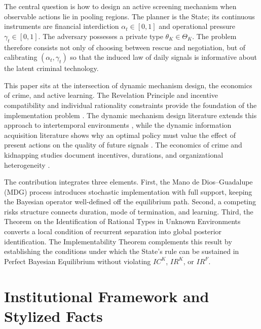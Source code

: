 \documentclass[12pt,a4paper]{article}
\providecommand{\parencite}{\citep}
\theoremstyle{plain}
\theoremstyle{definition}
\theoremstyle{remark}
\newcommand{\1}{\mathbf{1}}
\begin{document}
The central question is how to design an active screening mechanism when observable
actions lie in pooling regions. The planner is the State; its continuous instruments are
financial interdiction $\alpha_t\in[0,1]$ and operational pressure $\gamma_t\in[0,1]$.
The adversary possesses a private type $\theta_K\in\Theta_K$. The problem therefore
consists not only of choosing between rescue and negotiation, but of calibrating
$(\alpha_t,\gamma_t)$ so that the induced law of daily signals is informative about
the latent criminal technology.

This paper sits at the intersection of dynamic mechanism design, the economics of
crime, and active learning. The Revelation Principle and incentive compatibility and
individual rationality constraints provide the foundation of the implementation problem
\parencite{Gibbard1973,Myerson1979IC,Myerson1981,Rochet1987}. The dynamic mechanism
design literature extends this approach to intertemporal environments
\parencite{CourtyLi2000,EsoSzentes2007,PavanSegalToikka2014}, while the dynamic
information acquisition literature shows why an optimal policy must value the effect
of present actions on the quality of future signals \parencite{Zhong2022}. The
economics of crime and kidnapping studies document incentives, durations, and
organizational heterogeneity \parencite{Becker1968,Ehrlich1973,Selten1977Kidnapping,
Mejia2000Secuestro,Detotto2014Ransom,Forest2012Kidnapping,Shortland2019Kidnap}.

The contribution integrates three elements. First, the Mano de Dios--Guadalupe (MDG)
process introduces stochastic implementation with full support, keeping the Bayesian
operator well-defined off the equilibrium path. Second, a competing risks structure
connects duration, mode of termination, and learning. Third, the Theorem on the
Identification of Rational Types in Unknown Environments converts a local condition of
recurrent separation into global posterior identification. The Implementability Theorem
complements this result by establishing the conditions under which the State's rule can
be sustained in Perfect Bayesian Equilibrium without violating $IC^K$, $IR^K$, or
$IR^F$.

\section{Institutional Framework and Stylized Facts}
\label{sec:institutional}
\end{document}
